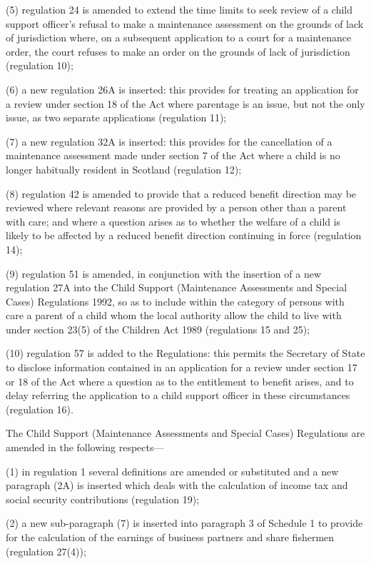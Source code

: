 \documentclass[a4paper]{article}
\begin{document}
 (5) regulation 24 is amended to extend the time limits to seek review of a child support officer’s refusal to make a maintenance assessment on the grounds of lack of jurisdiction where, on a subsequent application to a court for a maintenance order, the court refuses to make an order on the grounds of lack of jurisdiction (regulation 10);

 (6) a new regulation 26A is inserted: this provides for treating an application for a review under section 18 of the Act where parentage is an issue, but not the only issue, as two separate applications (regulation 11);

 (7) a new regulation 32A is inserted: this provides for the cancellation of a maintenance assessment made under section 7 of the Act where a child is no longer habitually resident in Scotland (regulation 12);

 (8) regulation 42 is amended to provide that a reduced benefit direction may be reviewed where relevant reasons are provided by a person other than a parent with care; and where a question arises as to whether the welfare of a child is likely to be affected by a reduced benefit direction continuing in force (regulation 14);

 (9) regulation 51 is amended, in conjunction with the insertion of a new regulation 27A into the Child Support (Maintenance Assessments and Special Cases) Regulations 1992, so as to include within the category of persons with care a parent of a child whom the local authority allow the child to live with under section 23(5) of the Children Act 1989 (regulations 15 and 25);

 (10) regulation 57 is added to the Regulations: this permits the Secretary of State to disclose information contained in an application for a review under section 17 or 18 of the Act where a question as to the entitlement to benefit arises, and to delay referring the application to a child support officer in these circumstances (regulation 16).

 The Child Support (Maintenance Assessments and Special Cases) Regulations are amended in the following respects---

 (1) in regulation 1 several definitions are amended or substituted and a new paragraph (2A) is inserted which deals with the calculation of income tax and social security contributions (regulation 19);

 (2) a new sub-paragraph (7) is inserted into paragraph 3 of Schedule 1 to provide for the calculation of the earnings of business partners and share fishermen (regulation 27(4));
\end{document}
